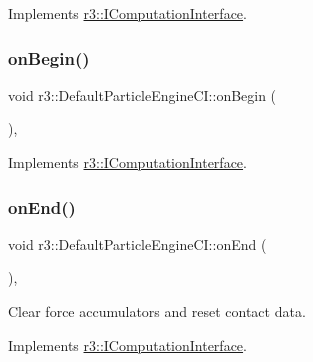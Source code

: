 Implements \mbox{\hyperlink{classr3_1_1_i_computation_interface_a162250f2b6efbd85460bd0f780d42cff}{r3\+::\+I\+Computation\+Interface}}.

\mbox{\label{classr3_1_1_default_particle_engine_c_i_aaf2e9ca87bff5e48c8eb59384e9cf180}} 
\subsubsection{\texorpdfstring{on\+Begin()}{onBegin()}}
{\footnotesize\ttfamily void r3\+::\+Default\+Particle\+Engine\+C\+I\+::on\+Begin (\begin{DoxyParamCaption}{ }\end{DoxyParamCaption})\hspace{0.3cm}{\ttfamily [override]}, {\ttfamily [virtual]}}



Implements \mbox{\hyperlink{classr3_1_1_i_computation_interface_a430ebc9cb8d4ba064ac6a032ef07edd7}{r3\+::\+I\+Computation\+Interface}}.

\mbox{\label{classr3_1_1_default_particle_engine_c_i_a6a34c77436d8133560eaa7366c740119}} 
\subsubsection{\texorpdfstring{on\+End()}{onEnd()}}
{\footnotesize\ttfamily void r3\+::\+Default\+Particle\+Engine\+C\+I\+::on\+End (\begin{DoxyParamCaption}{ }\end{DoxyParamCaption})\hspace{0.3cm}{\ttfamily [override]}, {\ttfamily [virtual]}}



Clear force accumulators and reset contact data. 



Implements \mbox{\hyperlink{classr3_1_1_i_computation_interface_acae0c5fada7e414c74fe6f5a8f4a6c7d}{r3\+::\+I\+Computation\+Interface}}.

